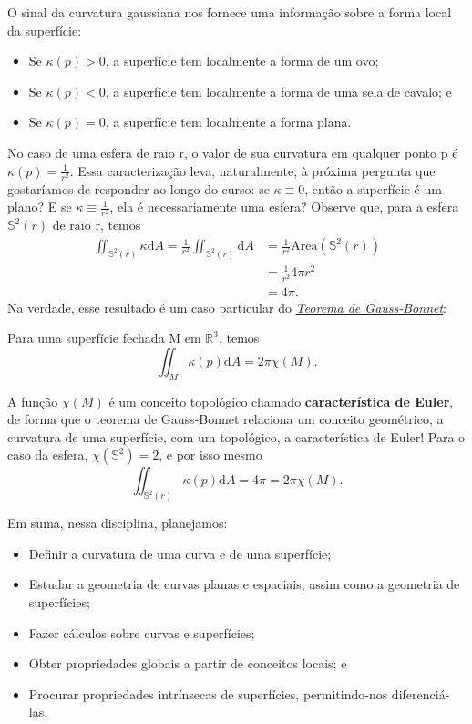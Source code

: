 \documentclass[../differential_geometry.tex]{subfiles}
\begin{document}
O sinal da curvatura gaussiana nos fornece uma informação sobre a forma local da superfície:
\begin{itemize}
	\item Se \(\kappa (p)>0\), a superfície tem localmente a forma de um ovo;
	\item Se \(\kappa (p)<0\), a superfície tem localmente a forma de uma sela de cavalo; e
	\item Se \(\kappa (p)=0\), a superfície tem localmente a forma plana.
\end{itemize}
No caso de uma esfera de raio r, o valor de sua curvatura em qualquer ponto p é \(\kappa (p)=\frac{1}{r^{2}}\). Essa caracterização leva, naturalmente, à próxima pergunta que gostaríamos de responder ao longo do curso: se \(\kappa \equiv 0\), então a superfície é um plano? E se \(\kappa \equiv \frac{1}{r^{2}}\), ela é necessariamente uma esfera?
Observe que, para a esfera \(\mathbb{S}^{2}(r)\) de raio r, temos
\begin{align*}
	\iint_{\mathbb{S}^{2}(r)}\kappa \mathrm{d}A = \frac{1}{r^{2}}\iint_{\mathbb{S}^{2}(r)} \mathrm{d}A & = \frac{1}{r^{2}} \mathrm{Area}(\mathbb{S}^{2}(r)) \\
	                                                                                                   & = \frac{1}{r^{2}}4\pi r^{2}                        \\
	                                                                                                   & = 4\pi.
\end{align*}
Na verdade, esse resultado é um caso particular do \hyperlink{gauss_bonnet}{\textit{Teorema de Gauss-Bonnet}}:
\begin{theorem*}
	Para uma superfície fechada M em \(\mathbb{R}^{3}\), temos
	\[
		\iint_{M}\kappa (p)\mathrm{d}A = 2\pi \chi (M).
	\]
\end{theorem*}
A função \(\chi (M)\) é um conceito topológico chamado \textbf{característica de Euler}, de forma que o teorema de Gauss-Bonnet relaciona um conceito geométrico, a curvatura de uma superfície, com um topológico, a característica de Euler! Para o caso da esfera, \(\chi (\mathbb{S}^{2})=2\), e por isso mesmo
\[
	\iint_{\mathbb{S}^{2}(r)}\kappa (p)\mathrm{d}A = 4\pi = 2\pi \chi (M).
\]

Em suma, nessa disciplina, planejamos:
\begin{itemize}
	\item Definir a curvatura de uma curva e de uma superfície;
	\item Estudar a geometria de curvas planas e espaciais, assim como a geometria de superfícies;
	\item Fazer cálculos sobre curvas e superfícies;
	\item Obter propriedades globais a partir de conceitos locais; e
	\item Procurar propriedades intrínsecas de superfícies, permitindo-nos diferenciá-las.
\end{itemize}
\end{document}
